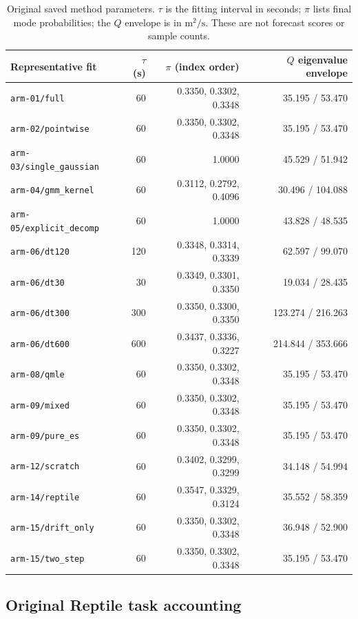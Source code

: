 \documentclass[11pt]{article}
\begin{document}
\begin{table}[htbp]
\centering\footnotesize
\caption{Original saved method parameters. $\tau$ is the fitting interval
in seconds; $\pi$ lists final mode probabilities; the $Q$ envelope is in
$\mathrm{m}^2/\mathrm{s}$. These are not forecast scores or sample counts.}
\label{tab:method-noise-parameters}
\begin{tabular}{lrrr}
\toprule
Representative fit & $\tau$ (s) & $\pi$ (index order) & $Q$ eigenvalue envelope\\
\midrule
\texttt{arm-01/full} & 60 & 0.3350, 0.3302, 0.3348 & 35.195 / 53.470\\
\texttt{arm-02/pointwise} & 60 & 0.3350, 0.3302, 0.3348 & 35.195 / 53.470\\
\texttt{arm-03/single\_gaussian} & 60 & 1.0000 & 45.529 / 51.942\\
\texttt{arm-04/gmm\_kernel} & 60 & 0.3112, 0.2792, 0.4096 & 30.496 / 104.088\\
\texttt{arm-05/explicit\_decomp} & 60 & 1.0000 & 43.828 / 48.535\\
\texttt{arm-06/dt120} & 120 & 0.3348, 0.3314, 0.3339 & 62.597 / 99.070\\
\texttt{arm-06/dt30} & 30 & 0.3349, 0.3301, 0.3350 & 19.034 / 28.435\\
\texttt{arm-06/dt300} & 300 & 0.3350, 0.3300, 0.3350 & 123.274 / 216.263\\
\texttt{arm-06/dt600} & 600 & 0.3437, 0.3336, 0.3227 & 214.844 / 353.666\\
\texttt{arm-08/qmle} & 60 & 0.3350, 0.3302, 0.3348 & 35.195 / 53.470\\
\texttt{arm-09/mixed} & 60 & 0.3350, 0.3302, 0.3348 & 35.195 / 53.470\\
\texttt{arm-09/pure\_es} & 60 & 0.3350, 0.3302, 0.3348 & 35.195 / 53.470\\
\texttt{arm-12/scratch} & 60 & 0.3402, 0.3299, 0.3299 & 34.148 / 54.994\\
\texttt{arm-14/reptile} & 60 & 0.3547, 0.3329, 0.3124 & 35.552 / 58.359\\
\texttt{arm-15/drift\_only} & 60 & 0.3350, 0.3302, 0.3348 & 36.948 / 52.900\\
\texttt{arm-15/two\_step} & 60 & 0.3350, 0.3302, 0.3348 & 35.195 / 53.470\\
\bottomrule
\end{tabular}
\end{table}

\subsection{Original Reptile task accounting}
\label{sec:reptile-task-accounting}
\end{document}
